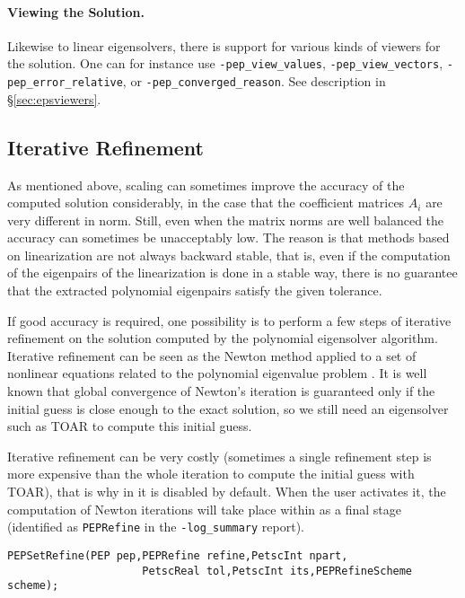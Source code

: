 \paragraph{Viewing the Solution.}

Likewise to linear eigensolvers, there is support for various kinds of viewers for the solution. One can for instance use \Verb!-pep_view_values!, \Verb!-pep_view_vectors!, \Verb!-pep_error_relative!, or \Verb!-pep_converged_reason!. See description in \S\ref{sec:epsviewers}.

\subsection{\label{sec:refine}Iterative Refinement}

As mentioned above, scaling can sometimes improve the accuracy of the computed solution considerably, in the case that the coefficient matrices $A_i$ are very different in norm. Still, even when the matrix norms are well balanced the accuracy can sometimes be unacceptably low. The reason is that methods based on linearization are not always backward stable, that is, even if the computation of the eigenpairs of the linearization is done in a stable way, there is no guarantee that the extracted polynomial eigenpairs satisfy the given tolerance.

If good accuracy is required, one possibility is to perform a few steps of iterative refinement on the solution computed by the polynomial eigensolver algorithm. Iterative refinement can be seen as the Newton method applied to a set of nonlinear equations related to the polynomial eigenvalue problem \citep{Betcke:2011:PER}. It is well known that global convergence of Newton's iteration is guaranteed only if the initial guess is close enough to the exact solution, so we still need an eigensolver such as TOAR to compute this initial guess.

Iterative refinement can be very costly (sometimes a single refinement step is more expensive than the whole iteration to compute the initial guess with TOAR), that is why in \slepc it is disabled by default. When the user activates it, the computation of Newton iterations will take place within  as a final stage (identified as \texttt{PEPRefine} in the \Verb!-log_summary! report).

	\begin{Verbatim}[fontsize=\small]
	PEPSetRefine(PEP pep,PEPRefine refine,PetscInt npart,
                     PetscReal tol,PetscInt its,PEPRefineScheme scheme);
	\end{Verbatim}

